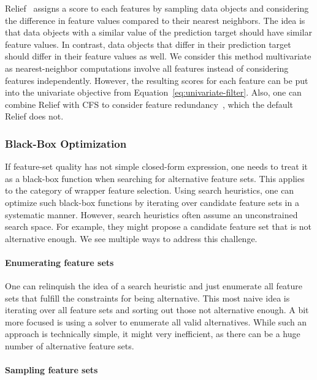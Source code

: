 \documentclass{article}
\theoremstyle{definition}
\begin{document}
Relief~\cite{kira1992feature} assigns a score to each features by sampling data objects and considering the difference in feature values compared to their nearest neighbors.
The idea is that data objects with a similar value of the prediction target should have similar feature values.
In contrast, data objects that differ in their prediction target should differ in their feature values as well.
We consider this method multivariate as nearest-neighbor computations involve all features instead of considering features independently.
However, the resulting scores for each feature can be put into the univariate objective from Equation~\ref{eq:univariate-filter}.
Also, one can combine Relief with CFS to consider feature redundancy~\cite{hall1999correlation}, which the default Relief does not.

\subsubsection{Black-Box Optimization}
\label{sec:approach:objectives:black-box}

If feature-set quality has not simple closed-form expression, one needs to treat it as a black-box function when searching for alternative feature sets.
This applies to the category of wrapper feature selection.
Using search heuristics, one can optimize such black-box functions by iterating over candidate feature sets in a systematic manner.
However, search heuristics often assume an unconstrained search space.
For example, they might propose a candidate feature set that is not alternative enough.
We see multiple ways to address this challenge.

\paragraph{Enumerating feature sets}

One can relinquish the idea of a search heuristic and just enumerate all feature sets that fulfill the constraints for being alternative.
This most naive idea is iterating over all feature sets and sorting out those not alternative enough.
A bit more focused is using a solver to enumerate all valid alternatives.
While such an approach is technically simple, it might very inefficient, as there can be a huge number of alternative feature sets.

\paragraph{Sampling feature sets}
\end{document}
